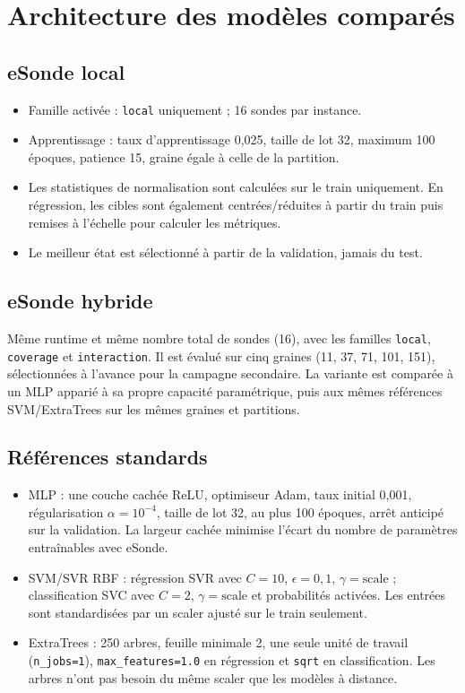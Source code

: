 \documentclass[11pt,a4paper]{article}
\begin{document}
\section{Architecture des modèles comparés}
\subsection{eSonde local}
\begin{itemize}
\item Famille activée : \texttt{local} uniquement ; 16 sondes par instance.
\item Apprentissage : taux d'apprentissage 0,025, taille de lot 32, maximum 100 époques, patience 15, graine égale à celle de la partition.
\item Les statistiques de normalisation sont calculées sur le train uniquement. En régression, les cibles sont également centrées/réduites à partir du train puis remises à l'échelle pour calculer les métriques.
\item Le meilleur état est sélectionné à partir de la validation, jamais du test.
\end{itemize}

\subsection{eSonde hybride}
Même runtime et même nombre total de sondes (16), avec les familles \texttt{local}, \texttt{coverage} et \texttt{interaction}. Il est évalué sur cinq graines (11, 37, 71, 101, 151), sélectionnées à l'avance pour la campagne secondaire. La variante est comparée à un MLP apparié à sa propre capacité paramétrique, puis aux mêmes références SVM/ExtraTrees sur les mêmes graines et partitions.

\subsection{Références standards}
\begin{itemize}
\item MLP : une couche cachée ReLU, optimiseur Adam, taux initial 0,001, régularisation $\alpha=10^{-4}$, taille de lot 32, au plus 100 époques, arrêt anticipé sur la validation. La largeur cachée minimise l'écart du nombre de paramètres entraînables avec eSonde.
\item SVM/SVR RBF : régression SVR avec $C=10$, $\epsilon=0,1$, $\gamma=\mathrm{scale}$ ; classification SVC avec $C=2$, $\gamma=\mathrm{scale}$ et probabilités activées. Les entrées sont standardisées par un scaler ajusté sur le train seulement.
\item ExtraTrees : 250 arbres, feuille minimale 2, une seule unité de travail (\texttt{n\_jobs=1}), \texttt{max\_features=1.0} en régression et \texttt{sqrt} en classification. Les arbres n'ont pas besoin du même scaler que les modèles à distance.
\end{itemize}
\end{document}
